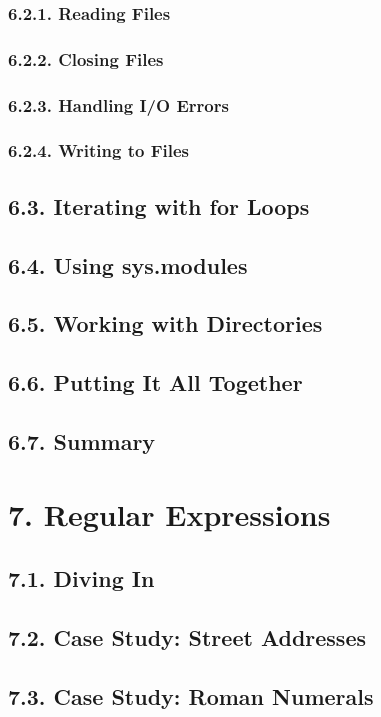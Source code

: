 \documentclass[oneside,12pt]{book}
\begin{document}
\subsection{6.2.1. Reading Files}
\subsection{6.2.2. Closing Files}
\subsection{6.2.3. Handling I/O Errors}
\subsection{6.2.4. Writing to Files}
       
\section{6.3. Iterating with for Loops}
\section{6.4. Using sys.modules}
\section{6.5. Working with Directories}
\section{6.6. Putting It All Together}
\section{6.7. Summary}
   
\chapter{7. Regular Expressions}
\section{7.1. Diving In}
\section{7.2. Case Study: Street Addresses}
\section{7.3. Case Study: Roman Numerals}
\end{document}
